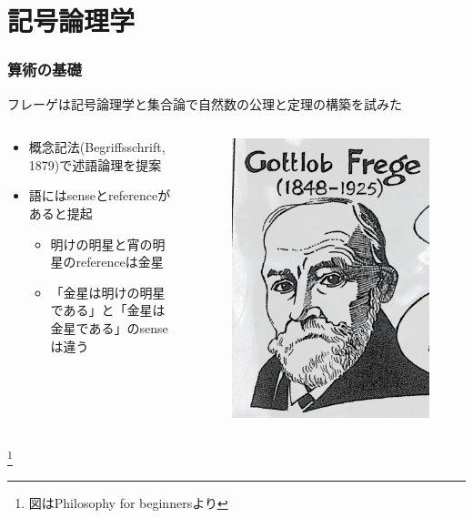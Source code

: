 \documentclass[unicode, 14pt, aspectratio=169]{beamer}
\newcommand\blfootnote[1]{%
  \begingroup
  \renewcommand\thefootnote{}\footnote{#1}%
  \addtocounter{footnote}{-1}%
  \endgroup
}
\begin{document}
\section{記号論理学}
\begin{frame}
  \frametitle{算術の基礎}
  {\large フレーゲは記号論理学と集合論で自然数の公理と定理の構築を試みた}
  \begin{columns}
    \begin{column}{0.8\textwidth}
      \begin{itemize}
      \item 概念記法(Begriffsschrift, 1879)で述語論理を提案
      \item 語にはsenseとreferenceがあると提起
        \begin{itemize}
        \item 明けの明星と宵の明星のreferenceは金星
        \item 「金星は明けの明星である」と「金星は金星である」のsenseは違う
        \end{itemize}
      \end{itemize}
    \end{column}    
    \begin{column}{0.2\textwidth}
      \begin{figure}
        \includegraphics[width=1\textwidth]{images/frege.png}
      \end{figure}       
    \end{column} 
  \end{columns}
  \blfootnote{図はPhilosophy for beginners\supercite{philosophy-for-begginers}より}
\end{frame}
\end{document}

